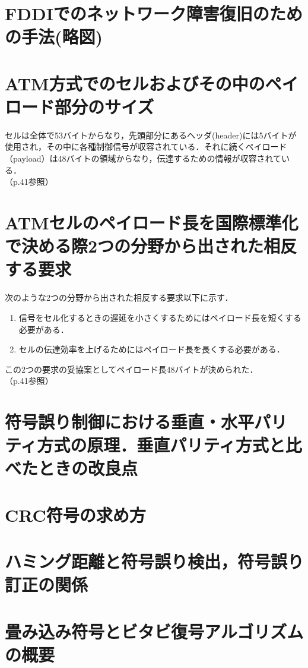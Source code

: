 \documentclass[10.5pt]{jsarticle}
\begin{document}
\section{FDDIでのネットワーク障害復旧のための手法(略図)}



\section{ATM方式でのセルおよびその中のペイロード部分のサイズ}
セルは全体で53バイトからなり，先頭部分にあるヘッダ(header)には5バイトが使用され，その中に各種制御信号が収容されている．それに続くペイロード（payload）は48バイトの領域からなり，伝達するための情報が収容されている．\\
（p.41参照）


\section{ATMセルのペイロード長を国際標準化で決める際2つの分野から出された相反する要求}
次のような2つの分野から出された相反する要求以下に示す．
\begin{enumerate}
\item 信号をセル化するときの遅延を小さくするためにはペイロード長を短くする必要がある．
\item セルの伝達効率を上げるためにはペイロード長を長くする必要がある．
\end{enumerate}
この2つの要求の妥協案としてペイロード長48バイトが決められた．\\
（p.41参照）

\section{符号誤り制御における垂直・水平パリティ方式の原理．垂直パリティ方式と比べたときの改良点}



\section{CRC符号の求め方}



\section{ハミング距離と符号誤り検出，符号誤り訂正の関係}



\section{畳み込み符号とビタビ復号アルゴリズムの概要}
\end{document}
